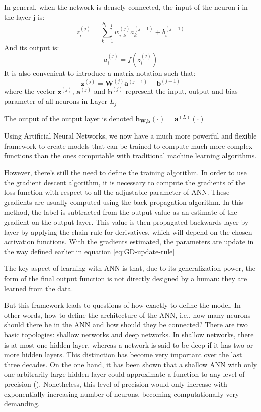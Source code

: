In general, when the network is densely connected, the input of the neuron i in the layer j is:
\begin{equation}
z_i^{(j)} = \sum_{k=1}^{S_{l-1}} w_{i,k}^{(j)} a_k^{(j-1)} + b_i^{(j-1)}  
\end{equation}
And its output is:
\begin{equation}
a_i^{(j)} = f(z_i^{(j)})
\end{equation}
It is also convenient to introduce a matrix notation such that:
\begin{equation}
\textbf{z}^{(j)} = \textbf{W}^{(j)} \textbf{a}^{(j-1)} + \textbf{b}^{(j-1)}
\end{equation}
where the vector $\textbf{z}^{(j)}$, $\textbf{a}^{(j)}$ and $\textbf{b}^{(j)}$ represent the input, output and bias parameter of all neurons in Layer $L_j$

The output of the output layer is denoted $\textbf{h}_{\textbf{W},\textbf{b}}\left( \cdot \right) = \textbf{a}^{(L)}\left( \cdot \right)$


Using Artificial Neural Networks, we now have a much more powerful and flexible framework to create models that can be trained to compute much more complex functions than the ones computable with traditional machine learning algorithms.

However, there's still the need to define the training algorithm. In order to use the gradient descent algorithm, it is necessary to compute the gradients of the loss function with respect to all the adjustable parameter of ANN. These gradients are usually computed using the back-propagation algorithm. In this method, the label is subtracted from the output value as an estimate of the gradient on the output layer. This value is then propagated backwards layer by layer by applying the chain rule for derivatives, which will depend on the chosen activation functions. With the gradients estimated, the parameters are update in the way defined earlier in equation \ref{eq:GD-update-rule}

The key aspect of learning with ANN is that, due to its generalization power, the form of the final output function is not directly designed by a human: they are learned from the data.

But this framework leads to questions of how exactly to define the model. In other words, how to define the architecture of the ANN, i.e., how many neurons should there be in the ANN and how should they be connected? There are two basic topologies: shallow networks and deep networks. In shallow networks, there is at most one hidden layer, whereas a network is said to be deep if it has two or more hidden layers. This distinction has become very important over the last three decades. On the one hand, it has been shown that a shallow ANN with only one arbitrarily large hidden layer could approximate a function to any level of precision (\cite{hornik1989multilayer}). Nonetheless, this level of precision would only increase with exponentially increasing number of neurons, becoming computationally very demanding.

